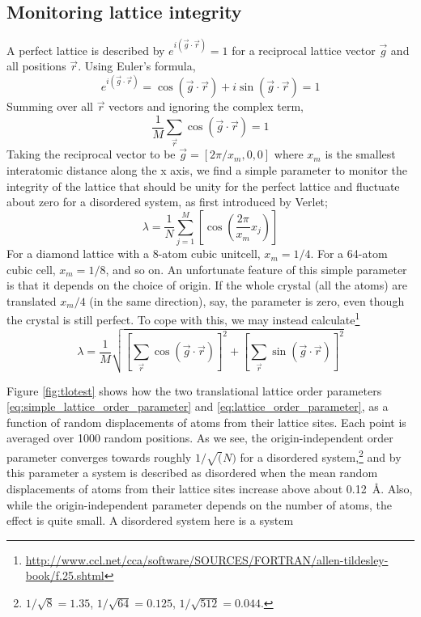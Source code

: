\documentclass[11pt,bibliography=totoc,index=totoc]{scrbook}   %
\begin{document}
\subsection{Monitoring lattice integrity}

A perfect lattice is described by $e^{i(\vec{g}\cdot\vec{r})}=1$ for a reciprocal lattice vector $\vec{g}$ and all positions $\vec{r}$. 
Using Euler's formula,
\begin{equation}
    e^{i(\vec{g}\cdot\vec{r})} = \cos(\vec{g}\cdot\vec{r}) + i\sin(\vec{g}\cdot\vec{r}) = 1
\end{equation}
Summing over all $\vec{r}$ vectors and ignoring the complex term,
\begin{equation}
    \frac{1}{M}\sum_{\vec{r}} \cos(\vec{g}\cdot\vec{r}) = 1
\end{equation}
Taking the reciprocal vector to be $\vec{g}=[2\pi/x_m,0,0]$ where $x_m$ is the smallest interatomic distance along the x axis, we find a simple parameter to monitor the integrity of the lattice that should be unity for the perfect lattice and fluctuate about zero for a disordered system, as first introduced by Verlet;
\begin{equation}
  \lambda = \frac{1}{N} \sum_{j=1}^M  \left[ \cos\left( \frac{2\pi}{x_m} x_j \right)\right]
  \label{eq:simple_lattice_order_parameter}
\end{equation}
For a diamond lattice with a 8-atom cubic unitcell, $x_m=1/4$. For a 64-atom cubic cell, $x_m=1/8$, and so on.
An unfortunate feature of this simple parameter is that it depends on the choice of origin. 
If the whole crystal (all the atoms) are translated $x_m/4$ (in the same direction), say, the parameter is zero, even though the crystal is still perfect.
To cope with this, we may instead calculate\footnote{\url{http://www.ccl.net/cca/software/SOURCES/FORTRAN/allen-tildesley-book/f.25.shtml}}
\begin{equation}
  \lambda = \frac{1}{M}\sqrt{\left[\sum_{\vec{r}}\cos(\vec{g}\cdot\vec{r})\right]^2 + \left[\sum_{\vec{r}}\sin(\vec{g}\cdot\vec{r})\right]^2}
  \label{eq:lattice_order_parameter}
\end{equation}

Figure \ref{fig:tlotest} shows how the two translational lattice order parameters \eqref{eq:simple_lattice_order_parameter} and \eqref{eq:lattice_order_parameter}, as a function of random displacements of atoms from their lattice sites. Each point is averaged over 1000 random positions. 
As we see, the origin-independent order parameter converges towards roughly $1/\sqrt(N)$ for a disordered system,\footnote{$1/\sqrt{8}=1.35$, $1/\sqrt{64}=0.125$, $1/\sqrt{512}=0.044$.}
and by this parameter a system is described as disordered when the mean random displacements of atoms from their lattice sites increase above about 0.12~Å.
Also, while the origin-independent parameter depends on the number of atoms, the effect is quite small.
A disordered system here is a system 
\end{document}
